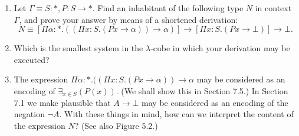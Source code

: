 \begin{problem}{6.8}
     \begin{enumerate}[label=$(\alph*)$]
    \item Let $\Gamma \equiv S : *, P : S \rightarrow *$. Find an inhabitant of the following type $N$ in context $\Gamma$, and prove your answer by means of a shortened derivation:
        $$N \equiv [\Pi \alpha : * . (( \Pi x : S . (P x \rightarrow \alpha)) \rightarrow \alpha)] \rightarrow [\Pi x : S . (P x \rightarrow \bot)] \rightarrow \bot.$$
    \item Which is the smallest system in the $\lambda$-cube in which your derivation may be executed?
    \item The expression $\Pi \alpha : * . (( \Pi x : S . (P x \rightarrow \alpha)) \rightarrow \alpha$ may be considered as an encoding of $\exists_{x \in S} (P(x))$. (We shall show this in Section 7.5.) In Section 7.1 we make plausible that $A \rightarrow \bot$ may be considered as an encoding of the negation $\neg A$. With these things in mind, how can we interpret the content of the expression $N$? (See also Figure 5.2.)
    \end{enumerate}
\end{problem}